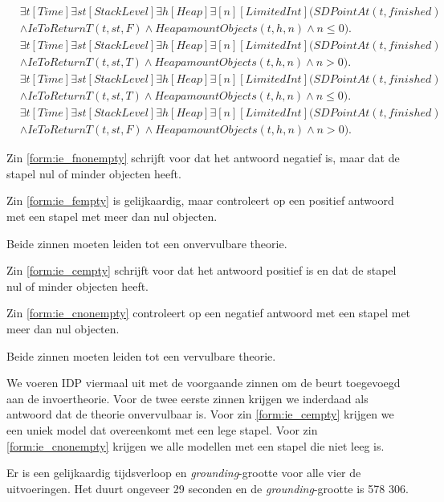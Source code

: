 \begin{align}
	\nonumber&\exists{t}[Time]\exists{st}[StackLevel]\exists{h}[Heap]\exists[n][LimitedInt](SDPointAt(t, finished) \\ &\land IeToReturnT(t, st, F) \land HeapamountObjects(t, h, n) \land n \leq 0).\label{form:ie_fnonempty} \\
	\nonumber&\exists{t}[Time]\exists{st}[StackLevel]\exists{h}[Heap]\exists[n][LimitedInt](SDPointAt(t, finished) \\ &\land IeToReturnT(t, st, T) \land HeapamountObjects(t, h, n) \land n > 0).\label{form:ie_fempty} \\
	\nonumber&\exists{t}[Time]\exists{st}[StackLevel]\exists{h}[Heap]\exists[n][LimitedInt](SDPointAt(t, finished) \\ &\land IeToReturnT(t, st, T) \land HeapamountObjects(t, h, n) \land n \leq 0).\label{form:ie_cempty} \\
	\nonumber&\exists{t}[Time]\exists{st}[StackLevel]\exists{h}[Heap]\exists[n][LimitedInt](SDPointAt(t, finished) \\ &\land IeToReturnT(t, st, F) \land HeapamountObjects(t, h, n) \land n > 0).\label{form:ie_cnonempty}
\end{align}

Zin \ref{form:ie_fnonempty} schrijft voor dat het antwoord negatief is, maar dat de stapel nul of minder objecten heeft.

Zin \ref{form:ie_fempty} is gelijkaardig, maar controleert op een positief antwoord met een stapel met meer dan nul objecten.

Beide zinnen moeten leiden tot een onvervulbare theorie.

Zin \ref{form:ie_cempty} schrijft voor dat het antwoord positief is en dat de stapel nul of minder objecten heeft.

Zin \ref{form:ie_cnonempty} controleert op een negatief antwoord met een stapel met meer dan nul objecten.

Beide zinnen moeten leiden tot een vervulbare theorie.

We voeren IDP viermaal uit met de voorgaande zinnen om de beurt toegevoegd aan de invoertheorie. Voor de twee eerste zinnen krijgen we inderdaad als antwoord dat de theorie onvervulbaar is. Voor zin \ref{form:ie_cempty} krijgen we een uniek model dat overeenkomt met een lege stapel. Voor zin \ref{form:ie_cnonempty} krijgen we alle modellen met een stapel die niet leeg is.

Er is een gelijkaardig tijdsverloop en \textit{grounding}-grootte voor alle vier de uitvoeringen. Het duurt ongeveer 29 seconden en de \textit{grounding}-grootte is 578 306.

